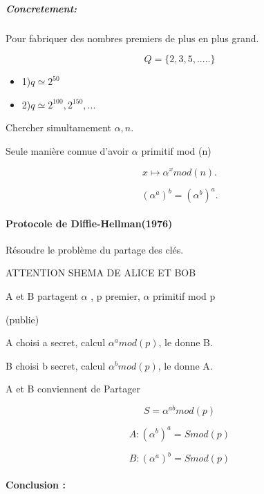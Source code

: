 \documentclass[12pt,a4paper]{article}
\begin{document}
\subparagraph{Concretement:} Pour fabriquer des nombres premiers de plus en plus grand.

\begin{displaymath}
Q=\{2,3,5, .....\}
\end{displaymath}

\begin{itemize}
\item 1)$q \simeq 2^{50}$
\item 2)$q \simeq 2^{100}, 2^{150},...$
\end{itemize}

Chercher simultamement $\alpha,n.$

Seule manière connue d'avoir $\alpha$ primitif mod (n)

\begin{displaymath}
x \longmapsto \alpha^x  mod (n).
\end{displaymath}

\begin{displaymath}
(\alpha^a)^b =(\alpha^b)^a.
\end{displaymath}

\paragraph{Protocole de Diffie-Hellman(1976)}

Résoudre le problème du partage des clés.

ATTENTION SHEMA DE ALICE ET BOB


A et B partagent $\alpha$ , p premier, $\alpha$ primitif mod p

(publie)

A choisi a secret, calcul $\alpha^a mod(p)$, le donne  B.

B choisi b secret, calcul $\alpha^b mod(p)$, le donne  A.

A et B conviennent de Partager

\begin{displaymath}
S=\alpha^ {ab} mod (p)
\end{displaymath}

\begin{displaymath}
A: (\alpha^b)^a = S mod (p)
\end{displaymath}

\begin{displaymath}
B: (\alpha^a)^b = S mod (p)
\end{displaymath}

\paragraph{Conclusion :}
\end{document}
